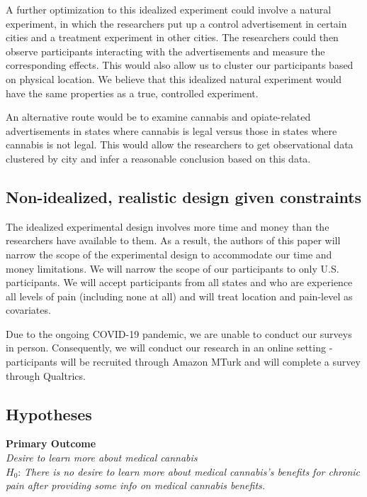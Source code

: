\documentclass[
]{article}
\begin{document}
A further optimization to this idealized experiment could involve a
natural experiment, in which the researchers put up a control
advertisement in certain cities and a treatment experiment in other
cities. The researchers could then observe participants interacting with
the advertisements and measure the corresponding effects. This would
also allow us to cluster our participants based on physical location. We
believe that this idealized natural experiment would have the same
properties as a true, controlled experiment.

An alternative route would be to examine cannabis and opiate-related
advertisements in states where cannabis is legal versus those in states
where cannabis is not legal. This would allow the researchers to get
observational data clustered by city and infer a reasonable conclusion
based on this data.

\hypertarget{non-idealized-realistic-design-given-constraints}{%
\subsection{Non-idealized, realistic design given
constraints}\label{non-idealized-realistic-design-given-constraints}}

The idealized experimental design involves more time and money than the
researchers have available to them. As a result, the authors of this
paper will narrow the scope of the experimental design to accommodate
our time and money limitations. We will narrow the scope of our
participants to only U.S. participants. We will accept participants from
all states and who are experience all levels of pain (including none at
all) and will treat location and pain-level as covariates.

Due to the ongoing COVID-19 pandemic, we are unable to conduct our
surveys in person. Consequently, we will conduct our research in an
online setting - participants will be recruited through Amazon MTurk and
will complete a survey through Qualtrics.

\hypertarget{hypotheses}{%
\subsection{Hypotheses}\label{hypotheses}}

\textbf{Primary Outcome}\\
\emph{Desire to learn more about medical cannabis}\\
\(H_{0}\): \emph{There is no desire to learn more about medical
cannabis's benefits for chronic pain after providing some info on
medical cannabis benefits.}
\end{document}
